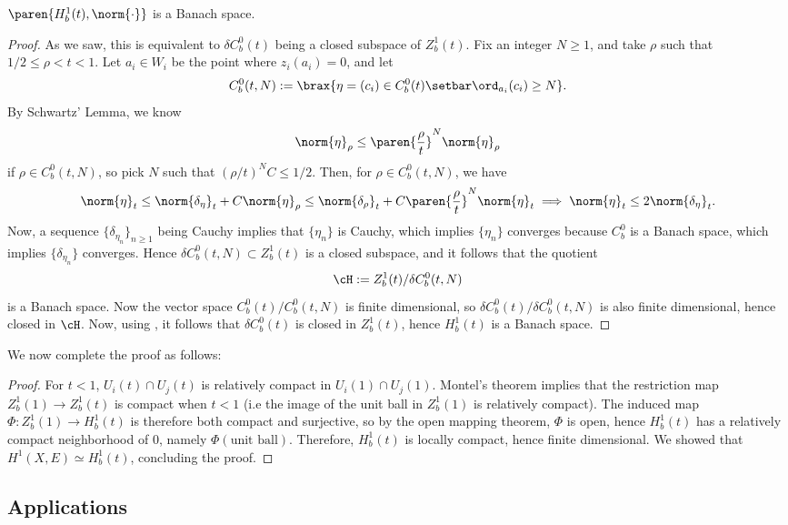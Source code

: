 \documentclass[11pt]{report}
\begin{document}
\begin{claim}
$\paren{H_b^1(t),\norm{\cdot}}$ is a Banach space.
\end{claim}
\begin{proof}
As we saw, this is equivalent to $\delta C_b^0(t)$ being a closed subspace of $Z_b^1(t)$. Fix an integer $N \geq 1$, and take $\rho$ such that $1/2 \leq \rho < t < 1$. Let $a_i \in W_i$ be the point where $z_i(a_i)=0$, and let
\[
C^0_b(t,N) := \brax{ \eta =(c_i)\in C_b^0(t) \setbar \ord_{a_i}(c_i) \geq N }.
\]
By Schwartz' Lemma, we know
\[
\norm{\eta}_\rho \leq \paren{\frac{\rho}{t}}^N\norm{\eta}_\rho
\]
if $\rho \in C_b^0(t,N)$, so pick $N$ such that $(\rho/t)^NC \leq 1/2$. Then, for $\rho \in C_b^0(t,N)$, we have
\[
\norm{\eta}_t \leq \norm{\delta_\eta}_t + C\norm{\eta}_\rho \leq \norm{\delta_\rho}_t + C\paren{\frac{\rho}{t}}^N\norm{\eta}_t \implies \norm{\eta}_t \leq 2 \norm{\delta_\eta}_t.
\] 
Now, a sequence $\{\delta_{\eta_n}\}_{n \geq 1}$ being Cauchy implies that $\{\eta_n\}$ is Cauchy, which implies $\{\eta_n\}$ converges because $C_b^0$ is a Banach space, which implies $\{\delta_{\eta_n}\}$ converges. Hence $\delta C_b^0(t,N) \subset Z_b^1(t)$ is a closed subspace, and it follows that the quotient
\[
\cH := Z_b^1(t)/\delta C_b^0(t,N)
\]
is a Banach space. Now the vector space $C_b^0(t)/C_b^0(t,N)$ is finite dimensional, so $\delta C_b^0(t)/ \delta C_b^0(t,N)$ is also finite dimensional, hence closed in $\cH$. Now, using , it follows that $\delta C_b^0(t)$ is closed in $Z_b^1(t)$, hence $H_b^1(t)$ is a Banach space.
\end{proof}
We now complete the proof as follows:
\begin{proof}
    For $t<1$, $U_i(t)\cap U_j(t)$ is relatively compact in $U_i(1) \cap U_j(1)$. Montel's theorem implies that the restriction map $Z_b^1(1) \to Z_b^1(t)$ is compact when $t<1$ (i.e the image of the unit ball in $Z_b^1(1)$ is relatively compact). The induced map $\Phi:Z^1_b(1) \to H_b^1(t)$ is therefore both compact and surjective, so by the open mapping theorem, $\Phi$ is open, hence $H_b^1(t)$ has a relatively compact neighborhood of $0$, namely $\Phi(\text{unit ball})$. Therefore, $H_b^1(t)$ is locally compact, hence finite dimensional. We showed that $H^1(X,E) \simeq H_b^1(t)$, concluding the proof.
\end{proof}

\subsection{Applications}
\end{document}
